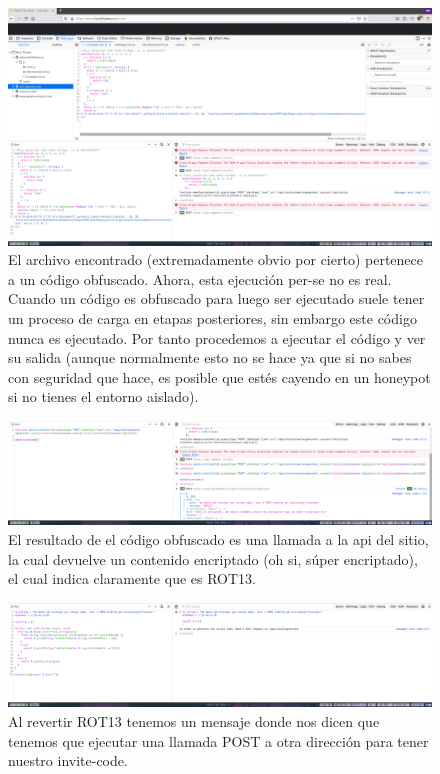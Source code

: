 \documentclass[11pt]{utalcaDoc}
\begin{document}
\begin{figure}[H]
	\centering
	\includegraphics[width=.9\textwidth]{images/03.png}
	\caption{ El archivo encontrado (extremadamente obvio por cierto) pertenece a un código obfuscado. Ahora, esta ejecución per-se no es real. Cuando un código es obfuscado para luego ser ejecutado suele tener un proceso de carga en etapas posteriores, sin embargo este código nunca es ejecutado. Por tanto procedemos a ejecutar el código y ver su salida (aunque normalmente esto no se hace ya que si no sabes con seguridad que hace, es posible que estés cayendo en un honeypot si no tienes el entorno aislado). }
\end{figure}
\begin{figure}[H]
	\centering
	\includegraphics[width=.9\textwidth]{images/04.png}
	\caption{ El resultado de el código obfuscado es una llamada a la api del sitio, la cual devuelve un contenido encriptado (oh si, súper encriptado), el cual indica claramente que es ROT13. }
\end{figure}
\begin{figure}[H]
	\centering
	\includegraphics[width=.9\textwidth]{images/05.png}
	\caption{ Al revertir ROT13 tenemos un mensaje donde nos dicen que tenemos que ejecutar una llamada POST a otra dirección para tener nuestro invite-code. }
\end{figure}
\end{document}
